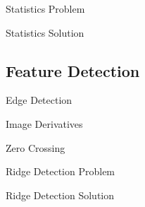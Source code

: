 \begin{frame}{Statistics Problem}
\end{frame}

\begin{frame}{Statistics Solution}
\end{frame}


%
%

\subsection{Feature Detection}
\begin{frame}{Edge Detection}
\end{frame}

\begin{frame}{Image Derivatives}
\end{frame}

\begin{frame}{Zero Crossing}
\end{frame}


\begin{frame}{Ridge Detection Problem}
\end{frame}

\begin{frame}{Ridge Detection Solution}
\end{frame}





